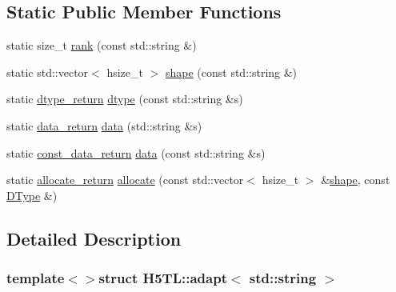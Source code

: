\subsection*{Static Public Member Functions}
\begin{DoxyCompactItemize}
\item 
static size\-\_\-t \hyperlink{struct_h5_t_l_1_1adapt_3_01std_1_1string_01_4_a11b50a2edef1a0df9cdf0e95e1ca0e26}{rank} (const std\-::string \&)
\item 
static std\-::vector$<$ hsize\-\_\-t $>$ \hyperlink{struct_h5_t_l_1_1adapt_3_01std_1_1string_01_4_a9e130d35a0f536ffc50becbbb93f29c0}{shape} (const std\-::string \&)
\item 
static \hyperlink{struct_h5_t_l_1_1adapt_3_01std_1_1string_01_4_a0118f83fcee595eab4291bbfc9e0b468}{dtype\-\_\-return} \hyperlink{struct_h5_t_l_1_1adapt_3_01std_1_1string_01_4_a31b994237c3654968e94b1114fd0666d}{dtype} (const std\-::string \&s)
\item 
static \hyperlink{struct_h5_t_l_1_1adapt_3_01std_1_1string_01_4_ae65d6d1845858272965eb9df9e1391f7}{data\-\_\-return} \hyperlink{struct_h5_t_l_1_1adapt_3_01std_1_1string_01_4_afb84f897f3f2eb4852075feab215a9b2}{data} (std\-::string \&s)
\item 
static \hyperlink{struct_h5_t_l_1_1adapt_3_01std_1_1string_01_4_a20cf03cb4783ce83295d1038409c6cee}{const\-\_\-data\-\_\-return} \hyperlink{struct_h5_t_l_1_1adapt_3_01std_1_1string_01_4_a47f42454a454aa2dca443b35a881ce52}{data} (const std\-::string \&s)
\item 
static \hyperlink{struct_h5_t_l_1_1adapt_3_01std_1_1string_01_4_ad34f256350ab9c209202b0cc0e84a8fd}{allocate\-\_\-return} \hyperlink{struct_h5_t_l_1_1adapt_3_01std_1_1string_01_4_af1b9be277434d16bf23e751763e24044}{allocate} (const std\-::vector$<$ hsize\-\_\-t $>$ \&\hyperlink{struct_h5_t_l_1_1adapt_3_01std_1_1string_01_4_a9e130d35a0f536ffc50becbbb93f29c0}{shape}, const \hyperlink{class_h5_t_l_1_1_d_type}{D\-Type} \&)
\end{DoxyCompactItemize}


\subsection{Detailed Description}
\subsubsection*{template$<$$>$struct H5\-T\-L\-::adapt$<$ std\-::string $>$}



